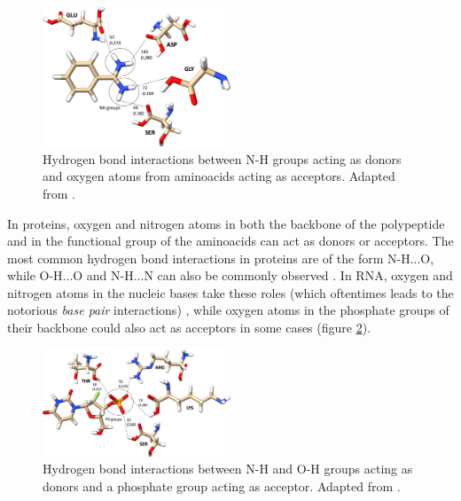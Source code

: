     \begin{figure}[H]
      \centering
      \includegraphics[width=0.5\textwidth]{figures/intro/hbonds.png}
      \caption{\label{fig:intro/hbonds} Hydrogen bond interactions between N-H groups acting as donors and oxygen atoms from aminoacids acting as acceptors. Adapted from \cite{hbonds_2023}.}
    \end{figure}

    In proteins, oxygen and nitrogen atoms in both the backbone of the polypeptide and in the functional group of the aminoacids can act as donors or acceptors. The most common hydrogen bond interactions in proteins are of the form N-H...O, while O-H...O and N-H...N can also be commonly observed \cite{hbonds_2023}. In RNA, oxygen and nitrogen atoms in the nucleic bases take these roles (which oftentimes leads to the notorious \textit{base pair} interactions) \cite{rna_2015}, while oxygen atoms in the phosphate groups of their backbone could also act as acceptors in some cases \cite{hbonds_2023} (figure \ref{fig:intro/hbonds_po}).

    \begin{figure}[H]
      \centering
      \includegraphics[width=0.5\textwidth]{figures/intro/hbonds_po.png}
      \caption{\label{fig:intro/hbonds_po} Hydrogen bond interactions between N-H and O-H groups acting as donors and a phosphate group acting as acceptor. Adapted from \cite{hbonds_2023}.}
    \end{figure}

